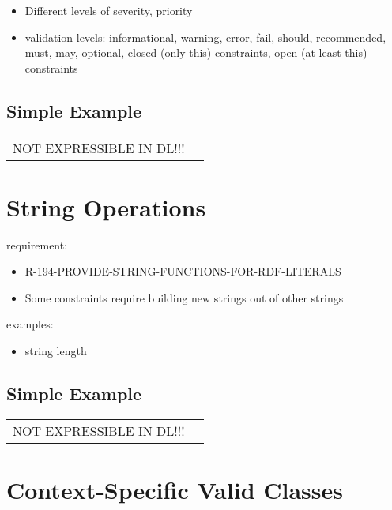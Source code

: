 \documentclass{llncs}
\newenvironment{DL}{
	\begin{center}
  \begin{tabular}{r l}

}{
  \end{tabular}
	\end{center}
}
\begin{document}
\begin{itemize}
  \item Different levels of severity, priority
	\item validation levels: informational, warning, error, fail, should, recommended, must, may, optional, closed (only this) constraints, open (at least this) constraints
\end{itemize}

\subsection{Simple Example}

\begin{DL}
NOT EXPRESSIBLE IN DL!!!
\end{DL}

\section{String Operations}

requirement:

\begin{itemize}
	\item R-194-PROVIDE-STRING-FUNCTIONS-FOR-RDF-LITERALS
\end{itemize}



\begin{itemize}
	\item Some constraints require building new strings out of other strings
\end{itemize}

examples:

\begin{itemize}
	\item string length
\end{itemize}

\subsection{Simple Example}

\begin{DL}
NOT EXPRESSIBLE IN DL!!!
\end{DL}



\section{Context-Specific Valid Classes}
\end{document}
